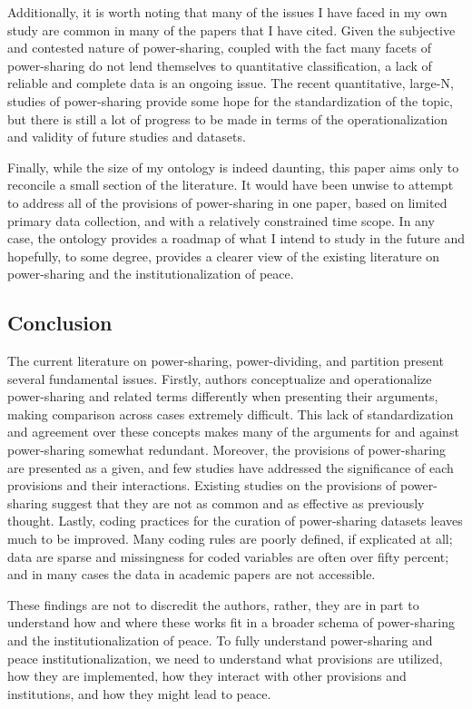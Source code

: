 \documentclass[12pt]{article}
\begin{document}
Additionally, it is worth noting that many of the issues I have faced in my own study are common in many of the papers that I have cited. Given the subjective and contested nature of power-sharing, coupled with the fact many facets of power-sharing do not lend themselves to quantitative classification, a lack of reliable and complete data is an ongoing issue. The recent quantitative, large-N, studies of power-sharing provide some hope for the standardization of the topic, but there is still a lot of progress to be made in terms of the operationalization and validity of future studies and datasets.  

Finally, while the size of my ontology is indeed daunting, this paper aims only to reconcile a small section of the literature. It would have been unwise to attempt to address all of the provisions of power-sharing in one paper, based on limited primary data collection, and with a relatively constrained time scope. In any case, the ontology provides a roadmap of what I intend to study in the future and hopefully, to some degree, provides a clearer view of the existing literature on power-sharing and the institutionalization of peace.  

\subsection{Conclusion}
The current literature on power-sharing, power-dividing, and partition present several fundamental issues. Firstly, authors conceptualize and operationalize power-sharing and related terms differently when presenting their arguments, making comparison across cases extremely difficult. This lack of standardization and agreement over these concepts makes many of the arguments for and against power-sharing somewhat redundant. Moreover, the provisions of power-sharing are presented as a given, and few studies have addressed the significance of each provisions and their interactions. Existing studies on the provisions of power-sharing suggest that they are not as common and as effective as previously thought. Lastly, coding practices for the curation of power-sharing datasets leaves much to be improved. Many coding rules are poorly defined, if explicated at all; data are sparse and missingness for coded variables are often over fifty percent; and in many cases the data in academic papers are not accessible. 

These findings are not to discredit the authors, rather, they are in part to understand how and where these works fit in a broader schema of power-sharing and the institutionalization of peace. To fully understand power-sharing and peace institutionalization, we need to understand what provisions are utilized, how they are implemented, how they interact with other provisions and institutions, and how they might lead to peace.
\end{document}
